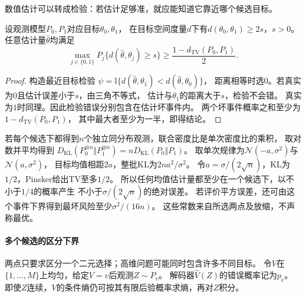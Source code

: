 数值估计可以转成检验：若估计足够准，就应能知道它靠近哪个候选目标。

\begin{theorem}[Le Cam两点下界]
\label{thm:information-le-cam}
设观测模型\(P_0,P_1\)对应目标\(\theta_0,\theta_1\)，
在目标空间度量\(d\)下有\(d(\theta_0,\theta_1)\geq2s\)，\(s>0\)。
任意估计量\(\widehat\theta\)均满足
\begin{equation}
  \max_{j\in\{0,1\}}P_j\{d(\widehat\theta,\theta_j)\geq s\}
  \geq\frac{1-d_{\mathrm{TV}}(P_0,P_1)}2.
  \label{eq:information-le-cam}
\end{equation}
\end{theorem}
\begin{proof}
构造最近目标检验
\(\psi=\mathbb I\{d(\widehat\theta,\theta_1)<d(\widehat\theta,\theta_0)\}\)，
距离相等时选\(0\)。若真实为\(0\)且估计误差小于\(s\)，由三角不等式，
估计与\(\theta_1\)的距离大于\(s\)，检验不会错。
真实为\(1\)时同理。因此检验错误分别包含在估计坏事件内。
两个坏事件概率之和至少为\(1-d_{\mathrm{TV}}(P_0,P_1)\)，
其中最大者至少为一半，即得结论。
\end{proof}

若每个候选下都得到\(n\)个独立同分布观测，联合密度比是单次密度比的乘积，
取对数并平均得到
\(D_{\mathrm{KL}}(P_0^{\otimes n}\Vert P_1^{\otimes n})
=nD_{\mathrm{KL}}(P_0\Vert P_1)\)。
取单次规律为\(\mathcal N(-a,\sigma^2)\)与\(\mathcal N(a,\sigma^2)\)，
目标均值相距\(2a\)，整批KL为\(2na^2/\sigma^2\)。
令\(a=\sigma/(2\sqrt n)\)，KL为\(1/2\)，Pinsker给出TV至多\(1/2\)。
所以任何均值估计量都至少在一个候选下，以不小于\(1/4\)的概率产生
不小于\(\sigma/(2\sqrt n)\)的绝对误差。
若评价平方误差，还可由这个事件下界得到最坏风险至少\(\sigma^2/(16n)\)。
这些常数来自所选两点及放缩，不声称最优。

\paragraph{多个候选的区分下界}
\label{sec:information-many-candidates}

两点只要求区分一个二元选择；高维问题可能同时包含许多不同目标。
令\(V\)在\(\{1,\ldots,M\}\)上均匀，给定\(V=v\)后观测\(Z\sim P_v\)。
解码器\(\widehat V(Z)\)的错误概率记为\(p_{\mathrm e}\)。
即使\(Z\)连续，\(V\)的条件熵仍可按其有限后验概率求熵，再对\(Z\)积分。

